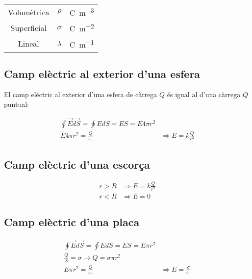 \vspace{1em}

\begin{center}
    \begin{tabular}{ccc}
        \toprule
        Volumètrica & $\rho$ & \si{\coulomb\per\metre\cubed} \\
        Superficial & $\sigma$ & \si{\coulomb\per\metre\squared} \\
        Lineal & $\lambda$ & \si{\coulomb\per\metre} \\
        \bottomrule
    \end{tabular}
\end{center}

\subsection{Camp elèctric al exterior d'una esfera}
\label{sub:camp_electric_al_exterior_d_una_esfera}
El camp elèctric al exterior d'una esfera de càrrega $Q$ és igual al d'una
càrrega $Q$ puntual:

\begin{align}
    \oint \vec{E}d\vec{S} = \oint EdS = ES = E4\pi r^2 \nonumber \\
    E4\pi r^2 = \frac{Q}{\varepsilon_0} & \Rightarrow E = k\frac{Q}{r^2}
\end{align}

\subsection{Camp elèctric d'una escorça}
\label{sub:camp_electric_d_una_escorca}

\begin{align}
    r > R & \Rightarrow E = k \frac{Q}{r^2} \\
    r < R & \Rightarrow E = 0
\end{align}

\subsection{Camp elèctric d'una placa}
\label{sub:camp_electric_d_una_placa}

\begin{align}
    \oint \vec{E}d\vec{S} = \oint EdS = ES = E\pi r^2 \nonumber \\
    \frac{Q}{S} = \sigma \rightarrow Q = \sigma \pi r^2 \nonumber \\
    E\pi r^2 = \frac{Q}{\varepsilon_0} & \Rightarrow E = \frac{\sigma}{\varepsilon_0}
\end{align}

